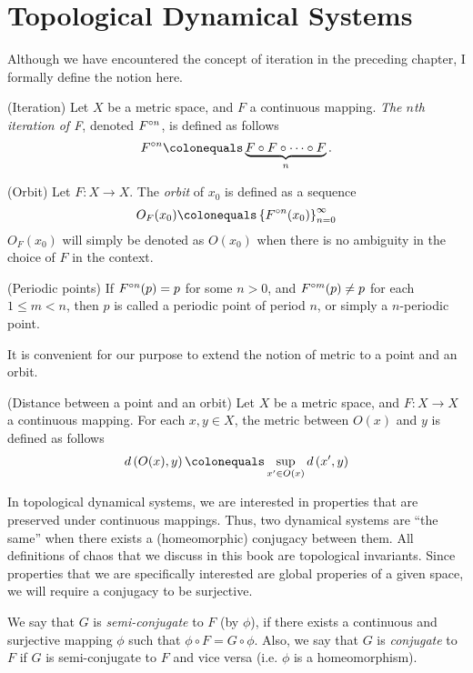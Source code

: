 \documentclass[12pt,twoside,draft]{book}
\begin{document}
\section{Topological Dynamical Systems}
Although we have encountered the concept of iteration in the preceding chapter, I formally define the notion here.
\begin{definition}
  (Iteration)
  Let $X$ be a metric space, and $F$ a continuous mapping.
  \textit{The $n$th iteration of F}, denoted $F^{\circ n}$, is defined as follows
  \begin{equation*}
    \itr{F}{n} \ceq \underbrace{F \circ F \circ \cdots \circ F}_{n} .
  \end{equation*}
\end{definition}
\begin{definition}
  (Orbit)
  Let $F: X \to X$. 
  The \textit{orbit} of $x_0$ is defined as a sequence
  \begin{equation*}
    O_F(x_0) \ceq \seq{\itr{F}{n}(x_0)}{\infty}{n = 0}
  \end{equation*}
  $O_F(x_0)$ will simply be denoted as $O(x_0)$ when there is no ambiguity in the choice of $F$ in the context.
  \label{def:orbit}
\end{definition}
\begin{definition}
  (Periodic points)
  If $F^{\circ n}(p) = p$ for some $n > 0$, and $F^{\circ m}(p) \neq p$ for each $1 \leq m < n$, then $p$ is called a periodic point of period $n$, or simply a $n$-periodic point.
  \label{def:porbit}
\end{definition}

It is convenient for our purpose to extend the notion of metric to a point and an orbit.
\begin{definition}
  (Distance between a point and an orbit)
  Let $X$ be a metric space, and $F: X \to X$ a continuous mapping.
  For each $x,y \in X$, the metric between $O(x)$ and $y$ is defined as follows
  \begin{equation*}
    \metric{O(x),y} \ceq \sup\limits_{x' \in O(x)} \metric{x',y}
  \end{equation*}
\end{definition}

In topological dynamical systems, we are interested in properties that are preserved under continuous mappings.
Thus, two dynamical systems are ``the same'' when there exists a (homeomorphic) conjugacy between them.
All definitions of chaos that we discuss in this book are topological invariants.
Since properties that we are specifically interested are global properies of a given space, we will require a conjugacy to be surjective. 
\begin{definition}
  We say that $G$ is \textit{semi-conjugate} to $F$ (by $\phi$), if there exists a continuous and surjective mapping $\phi$ such that $\phi\circ F = G\circ\phi$.
  Also, we say that $G$ is \textit{conjugate} to $F$ if $G$ is semi-conjugate to $F$ and vice versa (i.e. $\phi$ is a homeomorphism).
\end{definition}




\printindex
\end{document}

